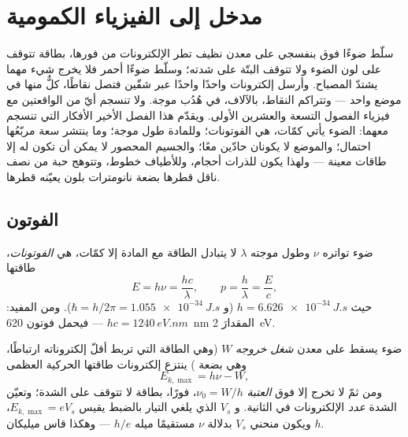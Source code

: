 \chapter{مدخل إلى الفيزياء الكمومية}\label{ch:b1:quantum-introduction}

سلّط ضوءًا فوق بنفسجي على معدن نظيف تطر الإلكترونات
من فورها، بطاقة تتوقف على لون الضوء ولا تتوقف
البتّة على شدته؛ وسلّط ضوءًا أحمر فلا يخرج شيء مهما
يشتدّ المصباح. وأرسل إلكترونات واحدًا واحدًا عبر شقّين فتصل
نقاطًا، كلٌّ منها في موضع واحد --- وتتراكم النقاط، بالآلاف،
في هُدُب موجة. ولا تنسجم أيّ من الواقعتين مع فيزياء
الفصول التسعة والعشرين الأولى. ويقدّم هذا الفصل الأخير
الأفكار التي تنسجم معهما: الضوء يأتي كمّات، هي الفوتونات؛ وللمادة
طول موجة؛ وما ينتشر سعة مربّعُها احتمال؛ والموضع
 لا يكونان حادّين معًا؛ والجسيم
المحصور لا يمكن أن تكون له إلا طاقات معينة --- ولهذا يكون للذرات
أحجام، وللأطياف خطوط، وتتوهج حبة من نصف ناقل قطرها بضعة
نانومترات بلون يعيّنه قطرها.

\section{الفوتون}

\begin{theorem}\label{thm:b1:quantum-introduction:photon}
ضوء تواتره $\nu$ وطول موجته $\lambda$ لا يتبادل الطاقة مع
المادة إلا كمّات، هي \emph{الفوتونات}، طاقتها 
\[
E = h\nu = \frac{hc}{\lambda} , \qquad p = \frac{h}{\lambda} = \frac{E}{c} ,
\]
حيث \emph{} $h = \qty{6.626e-34}{J.s}$ (و $\hbar = h/2\pi =
\qty{1.055e-34}{J.s}$). ومن المفيد: $hc = \qty{1240}{eV.nm}$ --- فيحمل فوتون
\qty{620}{nm} المقدارَ \qty{2}{eV}.
\end{theorem}
\admitted

\begin{proposition}\label{prop:b1:quantum-introduction:photoelectric}
ضوء يسقط على معدن \emph{شغل خروجه} $W$ (وهي الطاقة
التي تربط أقلّ إلكتروناته ارتباطًا، وهي بضعة ) ينتزع
إلكترونات طاقتها الحركية العظمى
\[
E_{k,\max} = h\nu - W ,
\]
ومن ثمّ لا تخرج إلا فوق \emph{العتبة} $\nu_0 = W/h$، فورًا، بطاقة
لا تتوقف على الشدة؛ وتعيّن الشدة \emph{عدد}
الإلكترونات في الثانية. و\emph{}
$V_s$ الذي يلغي التيار بالضبط يقيس $E_{k,\max} = eV_s$، ويكون
منحني $V_s$ بدلالة $\nu$ مستقيمًا ميله $h/e$ --- وهكذا
قاس ميليكان $h$.
\end{proposition}

